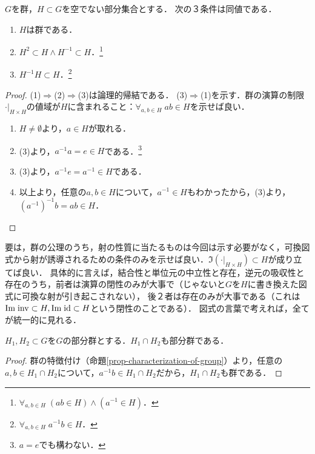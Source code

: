 \documentclass[uplatex,dvipdfmx]{jsreport}
\begin{document}
\begin{proposition}[群の特徴付け]\label{prop-characterization-of-group}
    $G$を群，$H\subset G$を空でない部分集合とする．
    次の３条件は同値である．
    \begin{enumerate}
        \item $H$は群である．
        \item $H^2\subset H\land H^{-1}\subset H$．\footnote{$\forall_{a,b\in H}\;(ab\in H)\land(a^{-1}\in H)$．}
        \item $H^{-1}H\subset H$．\footnote{$\forall_{a,b\in H}\;a^{-1}b\in H$．}
    \end{enumerate}
\end{proposition}
\begin{proof}
    (1)$\Rightarrow$(2)$\Rightarrow$(3)は論理的帰結である．
    (3)$\Rightarrow$(1)を示す．群の演算の制限$\cdot|_{H\times H}$の値域が$H$に含まれること：$\forall_{a,b\in H}\;ab\in H$を示せば良い．
    \begin{enumerate}[1.]
        \item $H\ne\emptyset$より，$a\in H$が取れる．
        \item (3)より，$a^{-1}a=e\in H$である．\footnote{$a=e$でも構わない．}
        \item (3)より，$a^{-1}e=a^{-1}\in H$である．
        \item 以上より，任意の$a,b\in H$について，$a^{-1}\in H$もわかったから，(3)より，$(a^{-1})^{-1}b=ab\in H$．
    \end{enumerate}
\end{proof}
\begin{remarks}
    要は，群の公理のうち，射の性質に当たるものは今回は示す必要がなく，可換図式から射が誘導されるための条件のみを示せば良い．$\Im(\cdot|_{H\times H})\subset H$が成り立てば良い．
    具体的に言えば，結合性と単位元の中立性と存在，逆元の吸収性と存在のうち，前者は演算の閉性のみが大事で（じゃないと$G$を$H$に書き換えた図式に可換な射が引き起こされない），
    後２者は存在のみが大事である（これは$\mathrm{Im}\;\mathrm{inv}\subset H,\mathrm{Im}\;\mathrm{id}\subset H$という閉性のことである）．
    図式の言葉で考えれば，全てが統一的に見れる．
\end{remarks}

\begin{corollary}[部分群の共通部分に関する閉性]
    $H_1,H_2\subset G$を$G$の部分群とする．$H_1\cap H_2$も部分群である．
\end{corollary}
\begin{proof}
    群の特徴付け（命題\ref{prop-characterization-of-group}）より，任意の$a,b\in H_1\cap H_2$について，$a^{-1}b\in H_1\cap H_2$だから，$H_1\cap H_2$も群である．
\end{proof}
\end{document}
